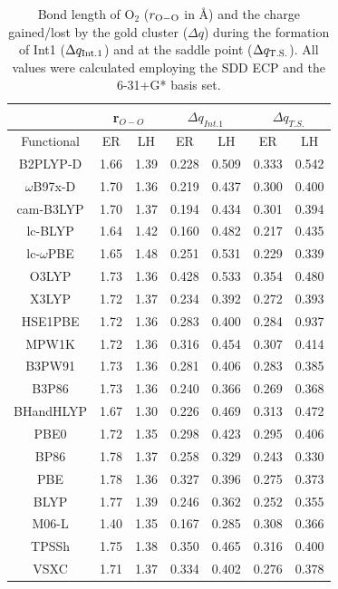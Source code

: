 \begin{table}[!ht]
\caption{Bond length of O$_2$ ($r_{\rm{O-O}}$ in \r{A}) and the charge gained/lost by the gold cluster ($\Delta q$) during the formation of Int1 ($\Delta q_{\rm{Int.1}}$) and at the saddle point ($\Delta q_{\rm{T.S.}}$). All values were calculated employing the SDD ECP and the 6-31+G* basis set.} \label{geom:error-bars}
\begin{small}
\begin{adjustbox}{max width=0.493\textwidth}
\begin{tabular}{|c|cc|cc|cc|}
\hline
&\multicolumn{2}{c|}{r$_{O-O}$}&\multicolumn{2}{c|}{$\Delta q_{Int.1}$}&\multicolumn{2}{c|}{$\Delta q_{T.S.}$}\\
\hline
Functional&ER&LH&ER&LH&ER&LH\\
\hline
 B2PLYP-D&1.66&1.39&0.228&0.509&0.333&0.542\\
$\omega$B97x-D&1.70&1.36&0.219&0.437&0.300&0.400\\
 cam-B3LYP&1.70&1.37&0.194&0.434&0.301&0.394\\
 lc-BLYP&1.64&1.42&0.160&0.482&0.217&0.435\\
  lc-$\omega$PBE&1.65&1.48&0.251&0.531&0.229&0.339\\
 O3LYP&1.73&1.36&0.428&0.533&0.354&0.480\\
X3LYP&1.72&1.37&0.234&0.392&0.272&0.393\\
HSE1PBE&1.72&1.36&0.283&0.400&0.284&0.937\\
MPW1K&1.72&1.36&0.316&0.454&0.307&0.414\\
B3PW91&1.73&1.36&0.281&0.406&0.283&0.385\\
B3P86&1.73&1.36&0.240&0.366&0.269&0.368\\
BHandHLYP&1.67&1.30&0.226&0.469&0.313&0.472\\
PBE0&1.72&1.35&0.298&0.423&0.295&0.406\\
 BP86&1.78&1.37&0.258&0.329&0.243&0.330\\
PBE&1.78&1.36&0.327&0.396&0.275&0.373\\
BLYP&1.77&1.39&0.246&0.362&0.252&0.355\\
 M06-L&1.40&1.35&0.167&0.285&0.308&0.366\\
TPSSh&1.75&1.38&0.350&0.465&0.316&0.400\\
VSXC&1.71&1.37&0.334&0.402&0.276&0.378\\
\hline
\end{tabular}
\end{adjustbox}
\end{small}
\end{table}  
